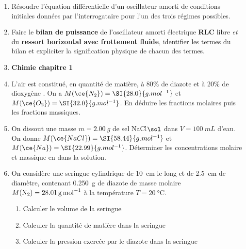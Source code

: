 \documentclass[a4paper, 12pt, final, garamond]{book}
\begin{document}
\begin{enumerate}
	\item Résoudre l'équation différentielle d'un oscillateur amorti de conditions
	      initiales données par l'interrogataire pour l'un des trois régimes
	      possibles.

	\item Faire le \textbf{bilan de puissance} de l'oscillateur amorti électrique
	      \textbf{RLC} libre \textit{et} du \textbf{ressort horizontal avec
		      frottement fluide}, identifier les termes du bilan et expliciter la
	      signification physique de chacun des termes.
	\item[] \textbf{Chimie chapitre 1}
	\item L'air est constitué, en quantité de matière, à 80\% de diazote  et
	      à 20\% de dioxygène .
	      \smallbreak
	      On a
	      $M(\ce{N_2}) = \SI{28.0}{g.mol^{-1}}$ et
	      $M(\ce{O_2}) = \SI{32.0}{g.mol^{-1}}$.
	      \smallbreak
	      En déduire les fractions molaires puis les fractions massiques.
	\item On dissout une masse $m = \SI{2.00}{g}$ de sel NaCl$\sol$ dans $V =
		      \SI{100}{mL}$ d'eau.
	      \smallbreak
	      On donne
	      $M(\ce{NaCl}) = \SI{58.44}{g.mol^{-1}}$ et
	      $M(\ce{Na}) = \SI{22.99}{g.mol^{-1}}$.
	      \smallbreak
	      Déterminer les concentrations molaire et massique en  dans la
	      solution.
	\item On considère une seringue cylindrique de \SI{10}{cm} le long et de
	      \SI{2.5}{cm} de diamètre, contenant \SI{0.250}{g} de diazote de masse
	      molaire $M({\rm N}_2) = \SI{28.01}{g.mol^{-1}}$ à la
	      température $T = \SI{20}{\degreeCelsius}$.
	      \begin{enumerate}
		      \item Calculer le volume de la seringue
		      \item Calculer la quantité de matière dans la seringue
		      \item Calculer la pression exercée par le diazote dans la seringue
	      \end{enumerate}
\end{enumerate}
\end{document}
